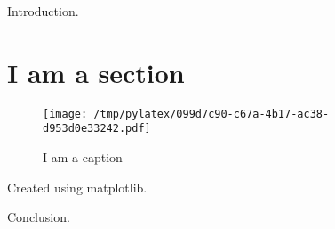 \documentclass{article}%
\begin{document}
%
\normalsize%
Introduction.%
\section{I am a section}%
\label{sec:Iamasection}%


\begin{figure}[htbp]%
\centering%
\texttt{[image: /tmp/pylatex/099d7c90-c67a-4b17-ac38-d953d0e33242.pdf]}%
\caption{I am a caption}%
\end{figure}

%
Created using matplotlib.

%
Conclusion.%
\end{document}
